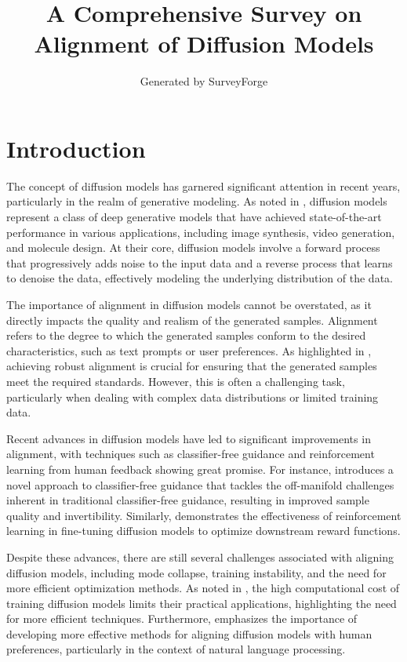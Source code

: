 \documentclass[11pt,a4paper]{article}
\title{A Comprehensive Survey on Alignment of Diffusion Models}
\author{Generated by SurveyForge}
\date{}
\begin{document}
\maketitle
\tableofcontents
\newpage



\section{Introduction}


The concept of diffusion models has garnered significant attention in recent years, particularly in the realm of generative modeling. As noted in \cite{doi:10.1145/3626235}, diffusion models represent a class of deep generative models that have achieved state-of-the-art performance in various applications, including image synthesis, video generation, and molecule design. At their core, diffusion models involve a forward process that progressively adds noise to the input data and a reverse process that learns to denoise the data, effectively modeling the underlying distribution of the data.

The importance of alignment in diffusion models cannot be overstated, as it directly impacts the quality and realism of the generated samples. Alignment refers to the degree to which the generated samples conform to the desired characteristics, such as text prompts or user preferences. As highlighted in \cite{arxiv:1809.01036}, achieving robust alignment is crucial for ensuring that the generated samples meet the required standards. However, this is often a challenging task, particularly when dealing with complex data distributions or limited training data.

Recent advances in diffusion models have led to significant improvements in alignment, with techniques such as classifier-free guidance and reinforcement learning from human feedback showing great promise. For instance, \cite{arxiv:2406.08070} introduces a novel approach to classifier-free guidance that tackles the off-manifold challenges inherent in traditional classifier-free guidance, resulting in improved sample quality and invertibility. Similarly, \cite{arxiv:2305.13301} demonstrates the effectiveness of reinforcement learning in fine-tuning diffusion models to optimize downstream reward functions.

Despite these advances, there are still several challenges associated with aligning diffusion models, including mode collapse, training instability, and the need for more efficient optimization methods. As noted in \cite{arxiv:2502.06805}, the high computational cost of training diffusion models limits their practical applications, highlighting the need for more efficient techniques. Furthermore, \cite{arxiv:2303.07576} emphasizes the importance of developing more effective methods for aligning diffusion models with human preferences, particularly in the context of natural language processing.
\end{document}
